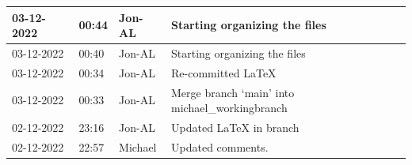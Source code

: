 \documentclass[11pt]{article}
\begin{document}
\begin{center}
\begin{longtable}{|p{2cm}|l|p{2cm}|p{10.5cm}|}
            03-12-2022                                 & 00:44                              & Jon-AL                                  & Starting organizing the files                                                                                                                                                                                                                                                                                \\ \hline
            03-12-2022                                 & 00:40                              & Jon-AL                                  & Starting organizing the files                                                                                                                                                                                                                                                                                \\ \hline
            03-12-2022                                 & 00:34                              & Jon-AL                                  & Re-committed LaTeX                                                                                                                                                                                                                                                                                           \\ \hline
            03-12-2022                                 & 00:33                              & Jon-AL                                  & Merge branch `main' into michael\_workingbranch                                                                                                                                                                                                                                                              \\ \hline
            02-12-2022                                 & 23:16                              & Jon-AL                                  & Updated LaTeX in branch                                                                                                                                                                                                                                                                                      \\ \hline
            02-12-2022                                 & 22:57                              & Michael                                 & Updated comments.                                                                                                                                                                                                                                                                                            \\ \hline

\end{longtable}
\end{center}
\end{document}
